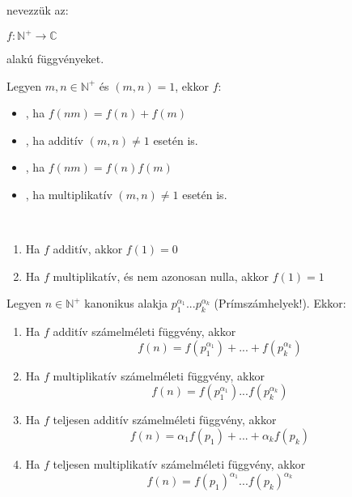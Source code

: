 \begin{frame}
  \begin{tcolorbox}[title={Def.: A számelméleti függvények}]
     nevezzük az:\\
    \mtinyskip
    
    $f : \mathbb{N}^+ \rightarrow \mathbb{C}$\\
    \mtinyskip
    
    alakú függvényeket.\\
    \mmedskip

    Legyen $m, n \in \mathbb{N}^+$ és $(m, n) = 1$, ekkor $f$:
    \begin{itemize}
      \item {}, ha $f(nm) = f(n) + f(m)$
      \item {}, ha additív $(m, n) \neq 1$ esetén is.
      \item {}, ha $f(nm) = f(n)f(m)$
      \item {}, ha multiplikatív $(m, n) \neq 1$ esetén is.
    \end{itemize}
  \tcblower
    \\
    \begin{enumerate}
      \item Ha $f$ additív, akkor $f(1) = 0$
      \item Ha $f$ multiplikatív, és nem azonosan nulla, akkor $f(1) = 1$
    \end{enumerate}
  \end{tcolorbox}

  \begin{tcolorbox}[title={Tétel: Számelméleti függvények}]
    Legyen $n \in \mathbb{N}^+$ kanonikus alakja $p_1^{{\alpha}_1}...p_k^{{\alpha}_k}$ (Prímszámhelyek!). Ekkor:\\
    \begin{enumerate}
      \item Ha $f$ additív számelméleti függvény, akkor $$f(n) = f(p_1^{{\alpha}_1}) + ... + f(p_k^{{\alpha}_k})$$
      \item Ha $f$ multiplikatív számelméleti függvény, akkor $$f(n) = f(p_1^{{\alpha}_1})...f(p_k^{{\alpha}_k})$$
      \item Ha $f$ teljesen additív számelméleti függvény, akkor $$f(n) = {\alpha}_1f(p_1) + ... + {\alpha}_kf(p_k)$$
      \item Ha $f$ teljesen multiplikatív számelméleti függvény, akkor $$f(n) = f(p_1)^{{\alpha}_1}...f(p_k)^{{\alpha}_k}$$
    \end{enumerate}
  \end{tcolorbox}
\end{frame}

